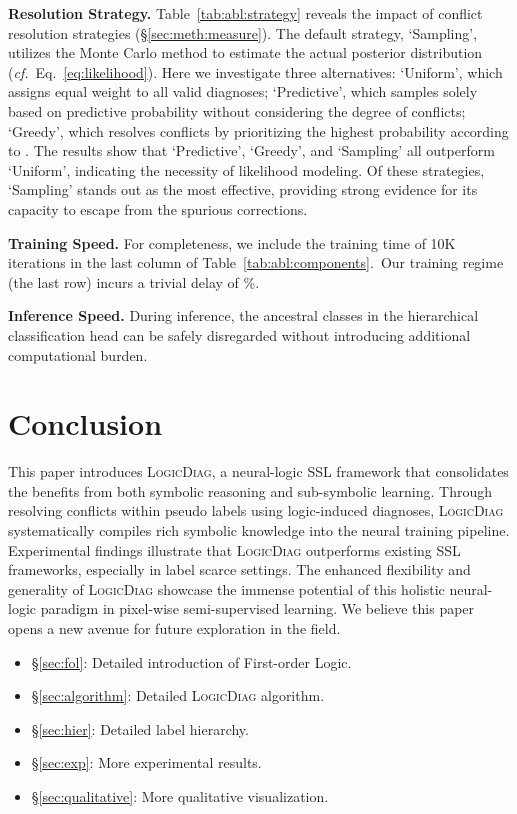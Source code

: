 \documentclass[10pt,twocolumn,letterpaper]{article}
\def\Ours{{\textsc{LogicDiag}}}
\begin{document}
\noindent\textbf{Resolution Strategy.}
Table~\ref{tab:abl:strategy} reveals the impact of conflict resolution strategies (\S\ref{sec:meth:measure}).
The default strategy, `Sampling', utilizes the Monte Carlo method to estimate the actual posterior distribution  (\textit{cf.\!}~Eq.~\ref{eq:likelihood}).
Here we investigate three alternatives: `Uniform', which assigns equal weight to all valid diagnoses;
`Predictive', which samples solely based on predictive probability  without considering the degree of conflicts;
`Greedy', which resolves conflicts by prioritizing the highest probability according to .
The results show that `Predictive', `Greedy', and `Sampling' all outperform `Uniform', indicating the necessity of likelihood modeling. Of these strategies, `Sampling' stands out as the most effective, providing strong evidence for its capacity to escape from the spurious corrections.

\noindent\textbf{Training Speed.} For completeness, we include the training time of 10K iterations in the last column of Table~\ref{tab:abl:components}.~Our training regime (the last row) incurs a trivial delay of \%.

\noindent\textbf{Inference Speed.} During inference, the ancestral classes in the hierarchical classification head can be safely disregarded without introducing additional computational burden.

\vfill
\section{Conclusion}
This paper introduces {\Ours}, a neural-logic SSL framework that consolidates the benefits from both symbolic reasoning and sub-symbolic learning. Through resolving conflicts within pseudo labels using logic-induced diagnoses, {\Ours} systematically compiles rich symbolic knowledge into the neural training pipeline.
Experimental findings illustrate that {\Ours} outperforms existing SSL frameworks, especially in label scarce settings. The enhanced flexibility and generality of {\Ours} showcase the immense potential of this holistic neural-logic paradigm in pixel-wise semi-supervised learning.
We believe this paper opens a new avenue for future exploration in the field.

\clearpage
{\small


}

\clearpage
\appendix

\begin{itemize}[leftmargin=*]
	\setlength{\itemsep}{0pt}
	\setlength{\parsep}{-2pt}
	\setlength{\parskip}{-0pt}
	\setlength{\leftmargin}{-10pt}
  \item \S\ref{sec:fol}: Detailed introduction of First-order Logic.
  \item \S\ref{sec:algorithm}: Detailed {\Ours} algorithm.
  \item \S\ref{sec:hier}: Detailed label hierarchy.
  \item \S\ref{sec:exp}: More experimental results.
  \item \S\ref{sec:qualitative}: More qualitative visualization.
\end{itemize}
\end{document}
